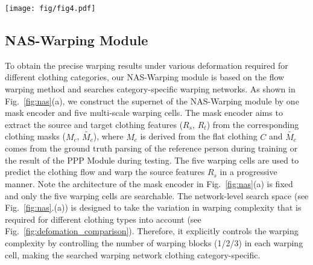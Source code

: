 \documentclass[sigconf]{acmart}
\newcommand*\chancery{\fontfamily{pzc}\selectfont}
\begin{document}
\begin{figure*}[t]
  \centering
  \texttt{[image: fig/fig4.pdf]}
  \vspace{-8mm}
  \caption{The search space for the NAS-Warping and the NAS-Fusion modules. Both of them have a network-level search space and an operation-level search space, labeled by \underline{\chancery{N}} and \underline{\chancery{O}}. For NAS-Warping, the network-level search space contains three warping branches within one warping cell, each of which has 1/2/3 warping blocks, and the operation-level search space designed for each warping block contains four operations: (1) 1$\times$1 convolution; (2) 1$\times$1 depthwise-separable convolution; (3) 3$\times$3 convolution; (4) 3$\times$3 depthwise-separable convolution. For the NAS-Fusion module, different types of skip-connections form the network-level search space, and two candidate operation sets for the upsampling and the downsampling processes respectively contain: (1) 3$\times$3 convolution; (2) 4$\times$4 convolution; (3) 5$\times$5 convolution; and (1) bilinear interpolation + 3$\times$3 convolution; (2) bilinear interpolation + 5$\times$5 convolution.}
  \label{fig:nas}
  \vspace{-4mm}
\end{figure*}

\subsection{NAS-Warping Module}\label{nas-warp}
To obtain the precise warping results under various deformation required for different clothing categories,
our NAS-Warping module is based on the flow warping method and searches category-specific warping networks.
As shown in Fig.~\ref{fig:nas}(a), we construct the supernet of the NAS-Warping module by one mask encoder and five multi-scale warping cells. 
The mask encoder aims to extract the source and target clothing features ($R_s$, $R_t$) from the corresponding clothing masks ($M_c$, $\widetilde{M_c}$), where $M_c$ is derived from the flat clothing $C$ and $\widetilde{M_c}$ comes from the ground truth parsing of the reference person during training or the result of the PPP Module during testing. 
The five warping cells are used to predict the clothing flow and warp the source features $R_s$ in a progressive manner. Note the architecture of the mask encoder in Fig.~\ref{fig:nas}(a) is fixed and only the five warping cells are searchable. 
The network-level search space \underline{\chancery{N}} (see Fig.~\ref{fig:nas}.(a)) is designed to take the variation in warping complexity that is required for different clothing types into account (see Fig.~\ref{fig:defomation_comparison}). Therefore, it explicitly controls the warping complexity by controlling the number of warping blocks (1/2/3) in each warping cell, making the searched warping network clothing category-specific.
\end{document}
